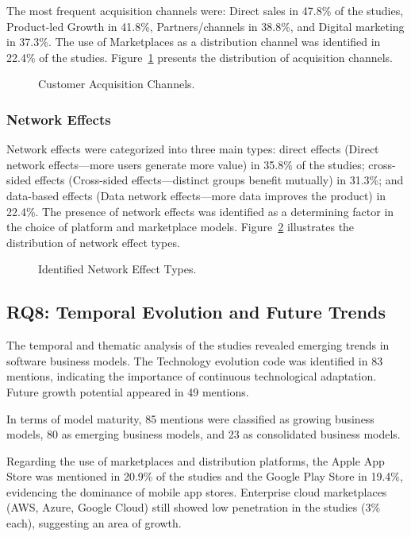\documentclass[journal]{IEEEtran}
\begin{document}
The most frequent acquisition channels were: Direct sales in 47.8\% of the studies, Product-led Growth in 41.8\%, Partners/channels in 38.8\%, and Digital marketing in 37.3\%. The use of Marketplaces as a distribution channel was identified in 22.4\% of the studies. Figure~\ref{fig:customer-channels} presents the distribution of acquisition channels.

\begin{figure}[!htb]
    \centering
    
    \caption{Customer Acquisition Channels.}
    \label{fig:customer-channels}
\end{figure}

\subsubsection{Network Effects}

Network effects were categorized into three main types: direct effects (Direct network effects---more users generate more value) in 35.8\% of the studies; cross-sided effects (Cross-sided effects---distinct groups benefit mutually) in 31.3\%; and data-based effects (Data network effects---more data improves the product) in 22.4\%. The presence of network effects was identified as a determining factor in the choice of platform and marketplace models. Figure~\ref{fig:network-effects} illustrates the distribution of network effect types.

\begin{figure}[!htb]
    \centering
    
    \caption{Identified Network Effect Types.}
    \label{fig:network-effects}
\end{figure}

\subsection{RQ8: Temporal Evolution and Future Trends}

The temporal and thematic analysis of the studies revealed emerging trends in software business models. The Technology evolution code was identified in 83 mentions, indicating the importance of continuous technological adaptation. Future growth potential appeared in 49 mentions.

In terms of model maturity, 85 mentions were classified as growing business models, 80 as emerging business models, and 23 as consolidated business models.

Regarding the use of marketplaces and distribution platforms, the Apple App Store was mentioned in 20.9\% of the studies and the Google Play Store in 19.4\%, evidencing the dominance of mobile app stores. Enterprise cloud marketplaces (AWS, Azure, Google Cloud) still showed low penetration in the studies (3\% each), suggesting an area of growth.
\end{document}
